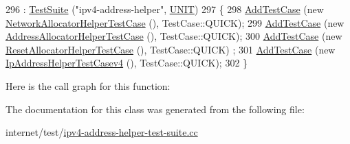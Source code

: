 \begin{DoxyCode}
296   : \hyperlink{classns3_1_1TestSuite_a904b0c40583b744d30908aeb94636d1a}{TestSuite} (\textcolor{stringliteral}{"ipv4-address-helper"}, \hyperlink{classns3_1_1TestSuite_a1ebfcab34ec8161e085e8e3a1855eae0a3885375a3787abf60431f8454b3cadbd}{UNIT})
297 \{
298   \hyperlink{classns3_1_1TestCase_a3718088e3eefd5d6454569d2e0ddd835}{AddTestCase} (\textcolor{keyword}{new} \hyperlink{classNetworkAllocatorHelperTestCase}{NetworkAllocatorHelperTestCase} (), 
      TestCase::QUICK);
299   \hyperlink{classns3_1_1TestCase_a3718088e3eefd5d6454569d2e0ddd835}{AddTestCase} (\textcolor{keyword}{new} \hyperlink{classAddressAllocatorHelperTestCase}{AddressAllocatorHelperTestCase} (), 
      TestCase::QUICK);
300   \hyperlink{classns3_1_1TestCase_a3718088e3eefd5d6454569d2e0ddd835}{AddTestCase} (\textcolor{keyword}{new} \hyperlink{classResetAllocatorHelperTestCase}{ResetAllocatorHelperTestCase} (), TestCase::QUICK)
      ;
301   \hyperlink{classns3_1_1TestCase_a3718088e3eefd5d6454569d2e0ddd835}{AddTestCase} (\textcolor{keyword}{new} \hyperlink{classIpAddressHelperTestCasev4}{IpAddressHelperTestCasev4} (), TestCase::QUICK);
302 \}
\end{DoxyCode}


Here is the call graph for this function\+:




The documentation for this class was generated from the following file\+:\begin{DoxyCompactItemize}
\item 
internet/test/\hyperlink{ipv4-address-helper-test-suite_8cc}{ipv4-\/address-\/helper-\/test-\/suite.\+cc}\end{DoxyCompactItemize}
